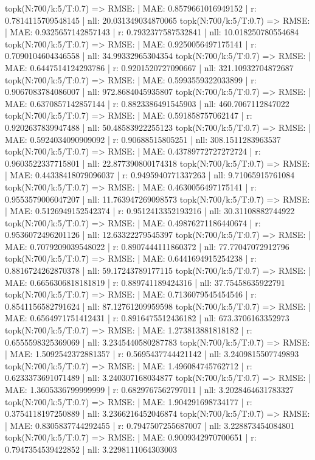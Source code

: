 topk(N:700/k:5/T:0.7) => RMSE: | MAE: 0.8579661016949152 | r: 0.7814115709548145 | nll: 20.031349034870065
topk(N:700/k:5/T:0.7) => RMSE: | MAE: 0.9325657142857143 | r: 0.7932377587532841 | nll: 10.018250780554684
topk(N:700/k:5/T:0.7) => RMSE: | MAE: 0.9250056497175141 | r: 0.7090104604346558 | nll: 34.99332965304354
topk(N:700/k:5/T:0.7) => RMSE: | MAE: 0.6447514124293786 | r: 0.9201520727090667 | nll: 321.10932704872687
topk(N:700/k:5/T:0.7) => RMSE: | MAE: 0.5993559322033899 | r: 0.9067083784086007 | nll: 972.8684045935807
topk(N:700/k:5/T:0.7) => RMSE: | MAE: 0.6370857142857144 | r: 0.8823386491545903 | nll: 460.7067112847022
topk(N:700/k:5/T:0.7) => RMSE: | MAE: 0.591858757062147 | r: 0.9202637839947488 | nll: 50.48583922255123
topk(N:700/k:5/T:0.7) => RMSE: | MAE: 0.5924034090909092 | r: 0.90688515805251 | nll: 308.1511283963537
topk(N:700/k:5/T:0.7) => RMSE: | MAE: 0.43789772727272724 | r: 0.9603522337715801 | nll: 22.877390800174318
topk(N:700/k:5/T:0.7) => RMSE: | MAE: 0.44338418079096037 | r: 0.9495940771337263 | nll: 9.71065915761084
topk(N:700/k:5/T:0.7) => RMSE: | MAE: 0.4630056497175141 | r: 0.9553579006047207 | nll: 11.763947269098573
topk(N:700/k:5/T:0.7) => RMSE: | MAE: 0.5126949152542374 | r: 0.9512413352193216 | nll: 30.31108882744922
topk(N:700/k:5/T:0.7) => RMSE: | MAE: 0.49876271186440674 | r: 0.9536072496201126 | nll: 12.63322279545397
topk(N:700/k:5/T:0.7) => RMSE: | MAE: 0.7079209039548022 | r: 0.8907444111860372 | nll: 77.77047072912796
topk(N:700/k:5/T:0.7) => RMSE: | MAE: 0.6441694915254238 | r: 0.8816724262870378 | nll: 59.17243789177115
topk(N:700/k:5/T:0.7) => RMSE: | MAE: 0.6656306818181819 | r: 0.889741189424316 | nll: 37.75458635922791
topk(N:700/k:5/T:0.7) => RMSE: | MAE: 0.7136079545454546 | r: 0.8541156582791624 | nll: 87.12761209959598
topk(N:700/k:5/T:0.7) => RMSE: | MAE: 0.6564971751412431 | r: 0.8916475512436182 | nll: 673.3706163352973
topk(N:700/k:5/T:0.7) => RMSE: | MAE: 1.273813881818182 | r: 0.6555598325369069 | nll: 3.2345440580287783
topk(N:700/k:5/T:0.7) => RMSE: | MAE: 1.5092542372881357 | r: 0.5695437744421142 | nll: 3.2409815507749893
topk(N:700/k:5/T:0.7) => RMSE: | MAE: 1.496084745762712 | r: 0.6233373691071489 | nll: 3.240307168034877
topk(N:700/k:5/T:0.7) => RMSE: | MAE: 1.3605336799999999 | r: 0.6829767562797011 | nll: 3.2028464631783327
topk(N:700/k:5/T:0.7) => RMSE: | MAE: 1.904291698734177 | r: 0.3754118197250889 | nll: 3.2366216452046874
topk(N:700/k:5/T:0.7) => RMSE: | MAE: 0.8305837744292455 | r: 0.7947507255687007 | nll: 3.228873454084801
topk(N:700/k:5/T:0.7) => RMSE: | MAE: 0.9009342970700651 | r: 0.7947354539422852 | nll: 3.2298111064303003
